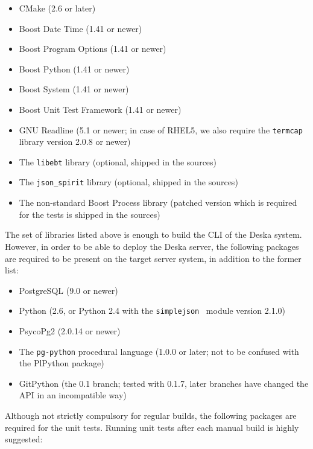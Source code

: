 \documentclass[deska]{subfiles}
\begin{document}
\begin{itemize}
    \item CMake (2.6 or later)~\cite{cmake}
    \item Boost Date Time (1.41 or newer)~\cite{boost}
    \item Boost Program Options (1.41 or newer)
    \item Boost Python (1.41 or newer)
    \item Boost System (1.41 or newer)
    \item Boost Unit Test Framework (1.41 or newer)
    \item GNU Readline (5.1 or newer; in case of RHEL5, we also require the {\tt termcap} library version 2.0.8 or
        newer)~\cite{gnu-readline}
    \item The {\tt libebt} library (optional, shipped in the sources)~\cite{libebt}
    \item The {\tt json\_spirit} library (optional, shipped in the sources)~\cite{json-spirit}
    \item The non-standard Boost Process library (patched version which is required for the tests is shipped in the
        sources)~\cite{boost-process}
\end{itemize}

The set of libraries listed above is enough to build the CLI of the Deska system.  However, in order to be able to
deploy the Deska server, the following packages are required to be present on the target server system, in addition to
the former list:

\begin{itemize}
    \item PostgreSQL (9.0 or newer)~\cite{postgresql}
    \item Python (2.6, or Python 2.4 with the {\tt simplejson}~\cite{simplejson} module version 2.1.0)~\cite{python}
    \item PsycoPg2 (2.0.14 or newer)~\cite{psycopg}
    \item The {\tt pg-python} procedural language (1.0.0 or later; not to be confused with the PlPython
        package)~\cite{pg-python}
    \item GitPython (the 0.1 branch; tested with 0.1.7, later branches have changed the API in an incompatible
        way)~\cite{git-python}
\end{itemize}

Although not strictly compulsory for regular builds, the following packages are required for the unit tests.  Running
unit tests after each manual build is highly suggested:
\end{document}
